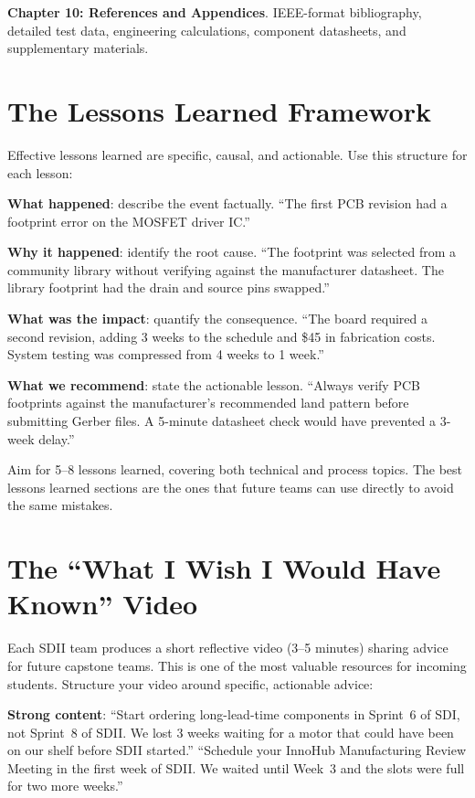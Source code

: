 \textbf{Chapter 10: References and Appendices}. IEEE-format bibliography, detailed test data, engineering calculations, component datasheets, and supplementary materials.

\section{The Lessons Learned Framework}
Effective lessons learned are specific, causal, and actionable. Use this structure for each lesson:

\textbf{What happened}: describe the event factually. ``The first PCB revision had a footprint error on the MOSFET driver IC.''

\textbf{Why it happened}: identify the root cause. ``The footprint was selected from a community library without verifying against the manufacturer datasheet. The library footprint had the drain and source pins swapped.''

\textbf{What was the impact}: quantify the consequence. ``The board required a second revision, adding 3 weeks to the schedule and \$45 in fabrication costs. System testing was compressed from 4 weeks to 1 week.''

\textbf{What we recommend}: state the actionable lesson. ``Always verify PCB footprints against the manufacturer's recommended land pattern before submitting Gerber files. A 5-minute datasheet check would have prevented a 3-week delay.''

Aim for 5--8 lessons learned, covering both technical and process topics. The best lessons learned sections are the ones that future teams can use directly to avoid the same mistakes.



\section{The ``What I Wish I Would Have Known'' Video}
Each SDII team produces a short reflective video (3--5 minutes) sharing advice for future capstone teams. This is one of the most valuable resources for incoming students. Structure your video around specific, actionable advice:

\textbf{Strong content}: ``Start ordering long-lead-time components in Sprint~6 of SDI, not Sprint~8 of SDII. We lost 3 weeks waiting for a motor that could have been on our shelf before SDII started.'' ``Schedule your InnoHub Manufacturing Review Meeting in the first week of SDII. We waited until Week~3 and the slots were full for two more weeks.''

